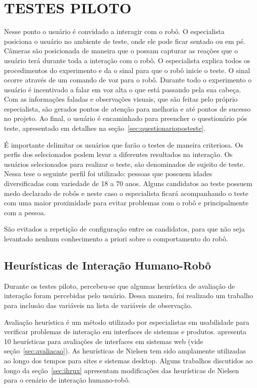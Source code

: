 \section{TESTES PILOTO}
\label{sec:ec_testespiloto}
Nesse ponto o usuário é convidado a interagir com o robô. O especialista posiciona o usuário no ambiente de teste, onde ele pode ficar sentado ou em pé. Câmeras são posicionada de maneira que o possam capturar as reações que o usuário terá durante toda a interação com o robô. O especialista explica todos os procedimentos do experimento e da o sinal para que o robô inicie o teste. O sinal ocorre através de um comando de voz para o robô. Durante todo o experimento o usuário é incentivado a falar em voz alta o que está passando pela sua cabeça. Com as informações faladas e observações visuais, que são feitas pelo próprio especialista, são gerados pontos de atenção para melhoria e até pontos de sucesso no projeto. Ao final, o usuário é encaminhado para preencher o questionário pós teste, apresentado em detalhes na seção~\ref{sec:questionarioposteste}.

É importante delimitar os usuários que farão o testes de maneira criteriosa. Os perfis dos selecionados podem levar a diferentes resultados na interação. Os usuários selecionados para realizar o teste, são denominados de sujeito de teste. Nessa tese o seguinte perfil foi utilizado: pessoas que possuem idades diversificadas com variedade de 18 a 70 anos. Alguns candidatos ao teste possuem medo declarado de robôs e neste caso o especialista ficará acompanhando o teste com uma maior proximidade para evitar problemas com o robô e principalmente com a pessoa.

São evitados a repetição de configuração entre os candidatos, para que não seja levantado nenhum conhecimento a priori sobre o comportamento do robô.

\subsection{Heurísticas de Interação Humano-Robô}
\label{sec:heuristicas}
Durante os testes piloto, percebeu-se que algumas heurística de avaliação de interação foram percebidas pelo usuário. Dessa maneira, foi realizado um trabalho para inclusão das variáveis na lista de variáveis de observação. 

Avaliação heurística é um método utilizado por especialistas em usabilidade para verificar problemas de interação em interfaces de sistemas e produtos.  apresenta 10 heurísticas para avaliações de interfaces em sistemas web (vide seção~\ref{sec:avaliacao}). As heurísticas de Nielsen tem sido amplamente utilizadas ao longo dos tempos para sites e sistemas desktop. Alguns trabalhos discutidos ao longo da seção~\ref{sec:ihrux} apresentam modificações das heurísticas de Nielsen para o cenário de interação humano-robô.

